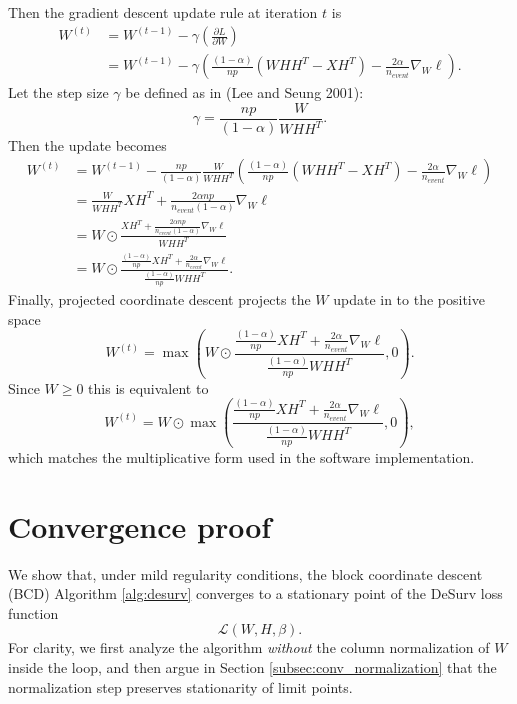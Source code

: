\documentclass[
]{article}
\begin{document}
Then the gradient descent update rule at iteration \(t\) is
\begin{align*}
  W^{(t)} &= W^{(t-1)} - \gamma \left( \frac{\partial L}{\partial W} \right) \\
          &= W^{(t-1)} - \gamma \left( \frac{(1-\alpha)}{np}\left( WHH^T - XH^T \right) - \frac{2\alpha}{n_{event}} \nabla_W \ell \right).
\end{align*} Let the step size \(\gamma\) be defined as in (Lee and
Seung 2001): \begin{equation*}
  \gamma = \frac{np}{(1-\alpha)}\frac{W}{WHH^T}.
\end{equation*} Then the update becomes \begin{align*}
  W^{(t)} &= W^{(t-1)} -\frac{np}{(1-\alpha)}\frac{W}{WHH^T} \left( \frac{(1-\alpha)}{np}\left( WHH^T - XH^T \right) - \frac{2\alpha}{n_{event}} \nabla_W \ell \right) \\
          &= \frac{W}{WHH^T} XH^T + \frac{2\alpha np}{n_{event}(1-\alpha)} \nabla_W \ell \\
          &= W \odot \frac{XH^T + \frac{2\alpha np}{n_{event}(1-\alpha)} \nabla_W \ell }{WHH^T} \\
          &= W \odot \frac{\frac{(1-\alpha)}{np} XH^T + \frac{2\alpha}{n_{event}} \nabla_W \ell}{\frac{(1-\alpha)}{np} WHH^T}.
\end{align*} Finally, projected coordinate descent projects the \(W\)
update in to the positive space \begin{equation*}
  W^{(t)} =  \max \left(W \odot \frac{\frac{(1-\alpha)}{np} XH^T + \frac{2\alpha}{n_{event}} \nabla_W \ell}{\frac{(1-\alpha)}{np}WHH^T}, 0\right).
\end{equation*} Since \(W \geq 0\) this is equivalent to
\begin{equation*}
  W^{(t)} =  W \odot \max \left( \frac{\frac{(1-\alpha)}{np} XH^T + \frac{2\alpha}{n_{event}} \nabla_W \ell}{\frac{(1-\alpha)}{np} WHH^T}, 0 \right),
\end{equation*} which matches the multiplicative form used in the
software implementation.

\section{Convergence proof}

We show that, under mild regularity conditions, the block coordinate
descent (BCD) Algorithm \ref{alg:desurv} converges to a stationary point
of the DeSurv loss function \[
\mathcal{L}(W,H,\beta).
\] For clarity, we first analyze the algorithm \emph{without} the column
normalization of \(W\) inside the loop, and then argue in Section
\ref{subsec:conv_normalization} that the normalization step preserves
stationarity of limit points.
\end{document}
